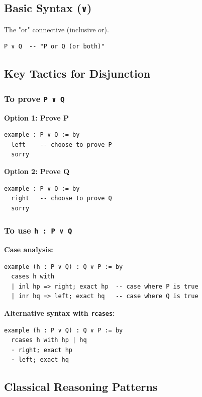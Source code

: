 \documentclass{amsart}
\theoremstyle{plain}
\theoremstyle{definition}
\theoremstyle{remark}
\begin{document}
\subsection{Basic Syntax (\lstinline{∨})}

The "or" connective (inclusive or).

\begin{lstlisting}[language=lean]
P ∨ Q  -- "P or Q (or both)"
\end{lstlisting}
\subsection{Key Tactics for Disjunction}

\subsubsection{To prove \lstinline{P ∨ Q}}

\textbf{Option 1: Prove P}

\begin{lstlisting}[language=lean]
example : P ∨ Q := by
  left    -- choose to prove P
  sorry
\end{lstlisting}
\textbf{Option 2: Prove Q}

\begin{lstlisting}[language=lean]
example : P ∨ Q := by
  right   -- choose to prove Q
  sorry
\end{lstlisting}
\subsubsection{To use \lstinline{h : P ∨ Q}}

\textbf{Case analysis:}

\begin{lstlisting}[language=lean]
example (h : P ∨ Q) : Q ∨ P := by
  cases h with
  | inl hp => right; exact hp  -- case where P is true
  | inr hq => left; exact hq   -- case where Q is true
\end{lstlisting}
\textbf{Alternative syntax with \lstinline{rcases}:}

\begin{lstlisting}[language=lean]
example (h : P ∨ Q) : Q ∨ P := by
  rcases h with hp | hq
  · right; exact hp
  · left; exact hq
\end{lstlisting}
\subsection{Classical Reasoning Patterns}
\end{document}
